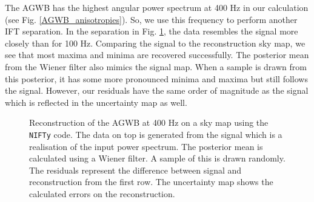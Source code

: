 The AGWB has the highest angular power spectrum at 400 Hz in our calculation (see Fig. \ref{AGWB_anisotropies}). So, we use this frequency to perform another IFT separation. In the separation in Fig. \ref{sky_maps_400}, the data resembles the signal more closely than for 100 Hz. Comparing the signal to the reconstruction sky map, we see that most maxima and minima are recovered successfully. The posterior mean from the Wiener filter also mimics the signal map. When a sample is drawn from this posterior, it has some more pronounced minima and maxima but still follows the signal. However, our residuals have the same order of magnitude as the signal which is reflected in the uncertainty map as well.

\begin{figure}[h]
    \centering
    \newline
    \vspace{-1.5cm}
    \caption[Reconstruction of the AGWB at 400 Hz on a sky map using the {\tt NIFTy} code.]{Reconstruction of the AGWB at 400 Hz on a sky map using the {\tt NIFTy} code. The data on top is generated from the signal which is a realisation of the input power spectrum. The posterior mean is calculated using a Wiener filter. A sample of this is drawn randomly. The residuals represent the difference between signal and reconstruction from the first row. The uncertainty map shows the calculated errors on the reconstruction.}
    \label{sky_maps_400}
\end{figure}

